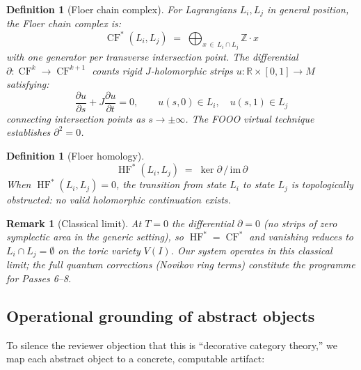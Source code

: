 \documentclass[11pt,a4paper]{article}
\newtheorem{definition}[theorem]{Definition}
\newtheorem{remark}[theorem]{Remark}
\DeclareMathOperator{\HF}{HF}
\DeclareMathOperator{\CF}{CF}
\begin{document}
\begin{definition}[Floer chain complex]
For Lagrangians $L_i, L_j$ in general position, the
\emph{Floer chain complex} is:
\[
  \CF^*(L_i, L_j) \;=\;
  \bigoplus_{x \,\in\, L_i \cap L_j} \mathbb{Z} \cdot x
\]
with one generator per transverse intersection point.
The differential $\partial: \CF^k \to \CF^{k+1}$ counts rigid
$J$-holomorphic strips $u: \mathbb{R} \times [0,1] \to M$
satisfying:
\[
  \frac{\partial u}{\partial s} + J\frac{\partial u}{\partial t} = 0,
  \qquad u(s,0) \in L_i,\quad u(s,1) \in L_j
\]
connecting intersection points as $s \to \pm\infty$.
The FOOO virtual technique~\cite{FOOO} establishes $\partial^2 = 0$.
\end{definition}

\begin{definition}[Floer homology]
\[
  \HF^*(L_i, L_j) \;=\; \ker\partial \,/\, \mathrm{im}\,\partial
\]
When $\HF^*(L_i, L_j) = 0$, the transition from state $L_i$ to
state $L_j$ is \emph{topologically obstructed}: no valid
holomorphic continuation exists.
\end{definition}

\begin{remark}[Classical limit]
At $T=0$ the differential $\partial = 0$ (no strips of zero
symplectic area in the generic setting), so $\HF^* = \CF^*$ and
vanishing reduces to $L_i \cap L_j = \emptyset$ on the toric
variety $V(I)$. Our system operates in this classical limit;
the full quantum corrections (Novikov ring terms) constitute
the programme for Passes 6--8.
\end{remark}

\subsection{Operational grounding of abstract objects}

To silence the reviewer objection that this is ``decorative
category theory,'' we map each abstract object to a concrete,
computable artifact:
\end{document}
